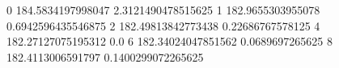 0 184.5834197998047 2.3121490478515625
1 182.9655303955078 0.6942596435546875
2 182.49813842773438 0.22686767578125
4 182.27127075195312 0.0
6 182.34024047851562 0.0689697265625
8 182.4113006591797 0.1400299072265625

